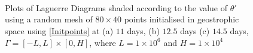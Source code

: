 \begin{figure}[h!]
	\centering
	\\
	\\
	\\
	\caption{Plots of Laguerre Diagrams shaded according to the value of $\theta '$ using a random mesh of $80 \times 40$ points initialised in geostrophic space using \ref{Initpoints} at (a) $11$ days, (b) $12.5$ days (c) $14.5$ days, $\Gamma = [-L,L]\times[0,H]$, where $L = 1\times10^6$ and $H = 1\times10^4$}
	\label{fig: front_cycle}
\end{figure}


